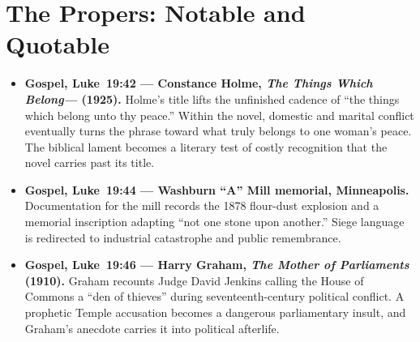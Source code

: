 \sectionguard
\section*{The Propers: Notable and Quotable}

{\small
\begin{itemize}[itemsep=0.35em,topsep=0.2em,parsep=0pt]
\item \textbf{Gospel, Luke~19:42 --- Constance Holme, \emph{The Things Which Belong---} (1925).} Holme's title lifts the unfinished cadence of ``the things which belong unto thy peace.'' Within the novel, domestic and marital conflict eventually turns the phrase toward what truly belongs to one woman's peace. The biblical lament becomes a literary test of costly recognition that the novel carries past its title.

\item \textbf{Gospel, Luke~19:44 --- Washburn ``A'' Mill memorial, Minneapolis.} Documentation for the mill records the 1878 flour-dust explosion and a memorial inscription adapting ``not one stone upon another.'' Siege language is redirected to industrial catastrophe and public remembrance.

\item \textbf{Gospel, Luke~19:46 --- Harry Graham, \emph{The Mother of Parliaments} (1910).} Graham recounts Judge David Jenkins calling the House of Commons a ``den of thieves'' during seventeenth-century political conflict. A prophetic Temple accusation becomes a dangerous parliamentary insult, and Graham's anecdote carries it into political afterlife.
\end{itemize}
}
